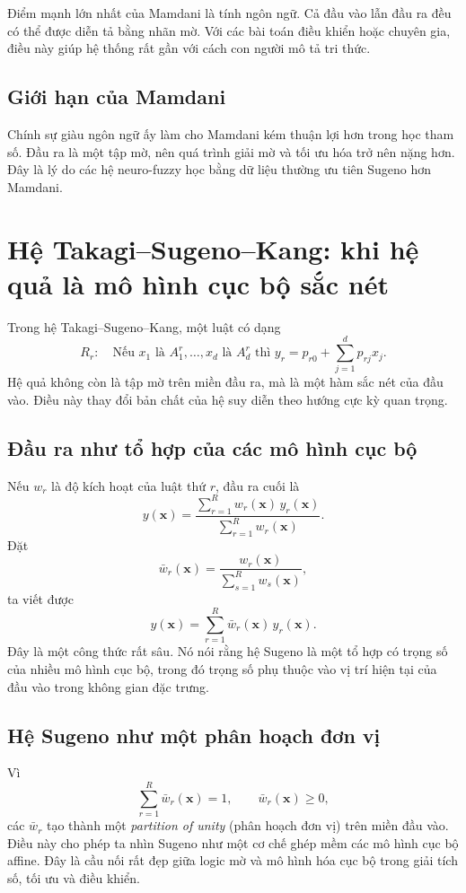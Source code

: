Điểm mạnh lớn nhất của Mamdani là tính ngôn ngữ. Cả đầu vào lẫn đầu ra đều có thể được diễn tả bằng nhãn mờ. Với các bài toán điều khiển hoặc chuyên gia, điều này giúp hệ thống rất gần với cách con người mô tả tri thức.

\subsection{Giới hạn của Mamdani}

Chính sự giàu ngôn ngữ ấy làm cho Mamdani kém thuận lợi hơn trong học tham số. Đầu ra là một tập mờ, nên quá trình giải mờ và tối ưu hóa trở nên nặng hơn. Đây là lý do các hệ neuro-fuzzy học bằng dữ liệu thường ưu tiên Sugeno hơn Mamdani.

\section{Hệ Takagi--Sugeno--Kang: khi hệ quả là mô hình cục bộ sắc nét}

Trong hệ Takagi--Sugeno--Kang, một luật có dạng
\[
R_r:\quad
\text{Nếu } x_1 \text{ là } A_1^r,\dots,x_d \text{ là } A_d^r
\text{ thì } y_r = p_{r0}+\sum_{j=1}^d p_{rj}x_j.
\]
Hệ quả không còn là tập mờ trên miền đầu ra, mà là một hàm sắc nét của đầu vào. Điều này thay đổi bản chất của hệ suy diễn theo hướng cực kỳ quan trọng.

\subsection{Đầu ra như tổ hợp của các mô hình cục bộ}

Nếu \(w_r\) là độ kích hoạt của luật thứ \(r\), đầu ra cuối là
\[
y(\bm{x})
=
\frac{\sum_{r=1}^R w_r(\bm{x})\,y_r(\bm{x})}{\sum_{r=1}^R w_r(\bm{x})}.
\]
Đặt
\[
\bar{w}_r(\bm{x})=\frac{w_r(\bm{x})}{\sum_{s=1}^R w_s(\bm{x})},
\]
ta viết được
\[
y(\bm{x})=\sum_{r=1}^R \bar{w}_r(\bm{x})\,y_r(\bm{x}).
\]
Đây là một công thức rất sâu. Nó nói rằng hệ Sugeno là một tổ hợp có trọng số của nhiều mô hình cục bộ, trong đó trọng số phụ thuộc vào vị trí hiện tại của đầu vào trong không gian đặc trưng.

\subsection{Hệ Sugeno như một phân hoạch đơn vị}

Vì
\[
\sum_{r=1}^R \bar{w}_r(\bm{x})=1,\qquad \bar{w}_r(\bm{x})\ge 0,
\]
các \(\bar{w}_r\) tạo thành một \emph{partition of unity} (phân hoạch đơn vị) trên miền đầu vào. Điều này cho phép ta nhìn Sugeno như một cơ chế ghép mềm các mô hình cục bộ affine. Đây là cầu nối rất đẹp giữa logic mờ và mô hình hóa cục bộ trong giải tích số, tối ưu và điều khiển.

